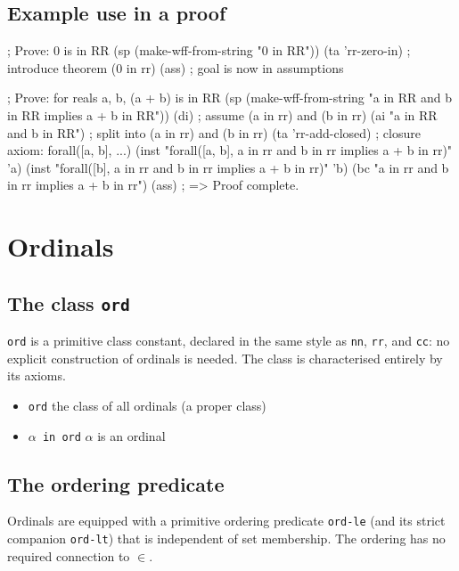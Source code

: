 \subsection{Example use in a proof}

\begin{VNBcode}
; Prove: 0 is in RR
(sp (make-wff-from-string "0 in RR"))
(ta 'rr-zero-in)                ; introduce theorem (0 in rr)
(ass)                           ; goal is now in assumptions

; Prove: for reals a, b, (a + b) is in RR
(sp (make-wff-from-string "a in RR and b in RR implies a + b in RR"))
(di)                              ; assume (a in rr) and (b in rr)
(ai "a in RR and b in RR")       ; split into (a in rr) and (b in rr)
(ta 'rr-add-closed)               ; closure axiom: forall([a, b], ...)
(inst "forall([a, b], a in rr and b in rr implies a + b in rr)" 'a)
(inst "forall([b], a in rr and b in rr implies a + b in rr)" 'b)
(bc "a in rr and b in rr implies a + b in rr")
(ass)
; => Proof complete.
\end{VNBcode}

\section{Ordinals}
\label{sec:ordinals}

\subsection{The class \texttt{ord}}

\texttt{ord} is a primitive class constant, declared in the same style as
\texttt{nn}, \texttt{rr}, and \texttt{cc}: no explicit construction of
ordinals is needed.  The class is characterised entirely by its axioms.

\begin{itemize}
\item \texttt{ord} the class of all ordinals (a proper class)
\item \texttt{$\alpha$ in ord} $\alpha$ is an ordinal
\end{itemize}

\subsection{The ordering predicate}

Ordinals are equipped with a primitive ordering predicate \texttt{ord-le}
(and its strict companion \texttt{ord-lt}) that is independent of set
membership.  The ordering has no required connection to $\in$.

